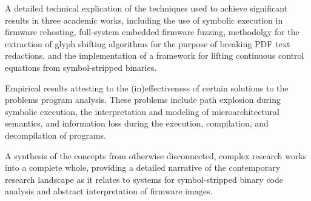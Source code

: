 \begin{prettylist}
\item A detailed technical explication of the techniques used to achieve significant results in three academic works, including the use of symbolic execution in firmware rehosting, full-system embedded firmware fuzzing, methodolgy for the extraction of glyph shifting algorithms for the purpose of breaking PDF text redactions, and the implementation of a framework for lifting continuous control equations from symbol-stripped binaries.
\item Empirical results attesting to the (in)effectiveness of certain solutions to the problems program analysis. These problems include path explosion during symbolic execution, the interpretation and modeling of microarchitectural semantics, and information loss during the execution, compilation, and decompilation of programs.
\item A synthesis of the concepts from otherwise disconnected, complex research works into a complete whole, providing a detailed narrative of the contemporary research landscape as it relates to systems for symbol-stripped binary code analysis and abstract interpretation of firmware images.
\end{prettylist}

